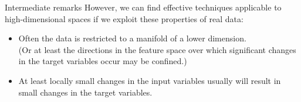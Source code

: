 \documentclass[11pt,compress,t,notes=noshow, xcolor=table]{beamer}
\begin{document}
\begin{framev}{Intermediate remarks}
However, we can find effective techniques applicable to high-dimensional spaces if we exploit these properties of real data:
\begin{itemize}
\item Often the data is restricted to a manifold of a lower dimension. \\ (Or at least the directions in the feature space over which significant changes in the target variables occur may be confined.)
\item At least locally small changes in the input variables usually will result in small changes in the target variables.
\end{itemize}

\vfill

\end{framev}

\endlecture
\end{document}

